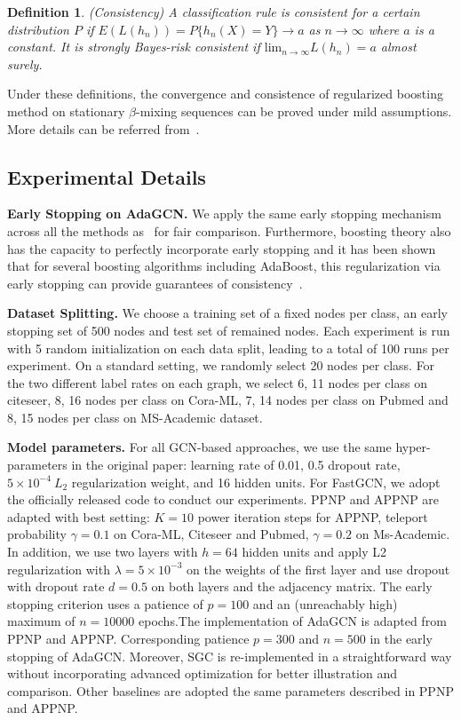 \documentclass{article} \usepackage{iclr2021_conference,times}
\newtheorem{defn}{Definition}
\begin{document}
\begin{defn}
	(Consistency) A classification rule is consistent for a certain distribution $P$ if $E(L(h_n)) = P\{h_n (X) = Y\}\rightarrow a$ as $n\rightarrow \infty$ where $a$ is a constant. It is strongly Bayes-risk consistent if $\text{lim}_{n\rightarrow \infty} L(h_n) = a$ almost surely.
\end{defn}

Under these definitions, the convergence and consistence of regularized boosting method on stationary $\beta$-mixing sequences can be proved under mild assumptions. More details can be referred from~\citep{lozano2013convergence}.

\subsection{Experimental Details}\label{sec:experiments}

\textbf{Early Stopping on AdaGCN.} We apply the same early stopping mechanism across all the methods as~\citep{klicpera2018predict} for fair comparison. Furthermore, boosting theory also has the capacity to perfectly incorporate early stopping and it has been shown that for several boosting algorithms including AdaBoost, this regularization via early stopping can provide guarantees of consistency~\citep{zhang2005boosting,jiang2004process,buhlmann2003boosting}.

\textbf{Dataset Splitting.} We choose a training set of a fixed nodes per class, an early stopping set of 500 nodes and test set of remained nodes. Each experiment is run with 5 random initialization on each data split, leading to a total
of 100 runs per experiment. On a standard setting, we randomly select 20 nodes per class. For the two different label rates on each graph, we select 6, 11 nodes per class on citeseer, 8, 16 nodes per class on Cora-ML, 7, 14 nodes per class on Pubmed and 8, 15 nodes per class on MS-Academic dataset.

\textbf{Model parameters.} For all GCN-based approaches, we use the same hyper-parameters in the original paper: learning rate of 0.01, 0.5 dropout rate, $5 \times 10^{-4} \ L_2$ regularization weight, and 16 hidden units. For FastGCN, we adopt the officially released code to conduct our experiments. PPNP and APPNP are adapted with best setting: $K=10$ power iteration steps for APPNP, teleport probability $\gamma=0.1$ on Cora-ML, Citeseer and Pubmed, $\gamma=0.2$ on Ms-Academic. In addition, we use two layers
with $h = 64$ hidden units and apply L2 regularization with $\lambda=5 \times 10^{-3}$ on the weights of the first layer and use dropout with dropout rate $d = 0.5$ on both layers and the adjacency matrix. The early stopping criterion uses a patience of $p = 100$ and an (unreachably high) maximum of $n = 10 000$ epochs.The implementation of AdaGCN is adapted from PPNP and APPNP. Corresponding patience $p=300$ and $n=500$ in the early stopping of AdaGCN. Moreover, SGC is re-implemented in a straightforward way without incorporating advanced optimization for better illustration and comparison. Other baselines are adopted the same parameters described in PPNP and APPNP.
\end{document}
